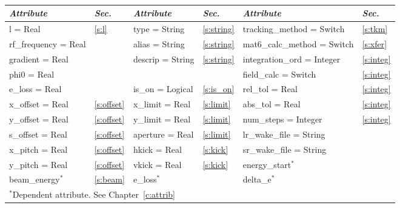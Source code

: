 {{\begin{center}
\tt
\begin{tabular}{|l|l||l|l||l|l|} \hline
  {\sl Attribute} & {\sl Sec.}  & {\sl Attribute} & {\sl Sec.} & {\sl Attribute} & {\sl Sec.} \\ \hline
  l        = Real       & \ref{s:l}      & type = String      & \ref{s:string} & tracking\_method = Switch   & \ref{s:tkm}   \\ \hline
  rf\_frequency = Real  &                & alias = String     & \ref{s:string} & mat6\_calc\_method = Switch & \ref{s:xfer}  \\ \hline
  gradient      = Real  &                & descrip = String   & \ref{s:string} & integration\_ord = Integer  & \ref{s:integ} \\ \hline
  phi0          = Real  &                &                    &                & field\_calc = Switch        & \ref{s:integ} \\ \hline
  e\_loss       = Real  &                & is\_on = Logical   & \ref{s:is_on}  & rel\_tol = Real             & \ref{s:integ} \\ \hline
  x\_offset  = Real     & \ref{s:offset} & x\_limit = Real    & \ref{s:limit}  & abs\_tol = Real             & \ref{s:integ} \\ \hline
  y\_offset  = Real     & \ref{s:offset} & y\_limit = Real    & \ref{s:limit}  & num\_steps = Integer        & \ref{s:integ} \\ \hline
  s\_offset  = Real     & \ref{s:offset} & aperture = Real    & \ref{s:limit}  & lr\_wake\_file = String     &               \\ \hline
  x\_pitch = Real       & \ref{s:offset} & hkick    = Real    & \ref{s:kick}   & sr\_wake\_file = String     &               \\ \hline
  y\_pitch = Real       & \ref{s:offset} & vkick    = Real    & \ref{s:kick}   & energy\_start$^*$           &               \\ \hline
  beam\_energy$^*$      & \ref{s:beam}   & e\_loss$^*$        &                & delta\_e$^*$                &               \\ \hline
  \multicolumn{6}{l}{\small $^*$Dependent attribute. See Chapter~\ref{c:attrib}} \\
\end{tabular}
\end{center}
\toffset

}}
